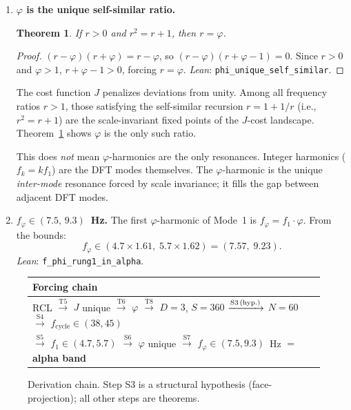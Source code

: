 \documentclass[11pt,a4paper]{article}
\newtheorem{theorem}{Theorem}
\begin{document}
\begin{enumerate}[resume,label=\textbf{S\arabic*.}]
  \item \textbf{$\varphi$ is the unique self-similar ratio.}

    \begin{theorem}
    \label{thm:phi-unique}
    If $r>0$ and $r^2=r+1$, then $r=\varphi$.
    \end{theorem}
    \begin{proof}
    $(r-\varphi)(r+\varphi)=r-\varphi$, so $(r-\varphi)(r+\varphi-1)=0$.
    Since $r>0$ and $\varphi>1$, $r+\varphi-1 > 0$, forcing $r=\varphi$.
    \emph{Lean}: \texttt{phi\_unique\_self\_similar}.
    \end{proof}

    The cost function $J$ penalizes deviations from unity. Among
    all frequency ratios $r>1$, those satisfying the self-similar
    recursion $r = 1 + 1/r$ (i.e., $r^2=r+1$) are the scale-invariant
    fixed points of the $J$-cost landscape. Theorem~\ref{thm:phi-unique}
    shows $\varphi$ is the only such ratio.

    This does \emph{not} mean $\varphi$-harmonics are the only
    resonances. Integer harmonics ($f_k = k f_1$) are the DFT modes
    themselves. The $\varphi$-harmonic is the unique \emph{inter-mode}
    resonance forced by scale invariance; it fills the gap between
    adjacent DFT modes.

  \item \textbf{$f_\varphi \in (7.5,\,9.3)$~Hz.}
    The first $\varphi$-harmonic of Mode~1 is $f_\varphi = f_1 \cdot
    \varphi$. From the bounds:
    \begin{equation}
      \label{eq:phi-rung}
      f_\varphi \in (4.7 \times 1.61,\; 5.7 \times 1.62) = (7.57,\; 9.23).
    \end{equation}
    \emph{Lean}: \texttt{f\_phi\_rung1\_in\_alpha}.
\end{enumerate}

\begin{figure}[H]
\centering
\begin{tabular}{@{}p{}@{}}
\toprule
\textbf{Forcing chain} \\
\midrule
RCL $\xrightarrow{\text{T5}}$ $J$ unique
$\xrightarrow{\text{T6}}$ $\varphi$
$\xrightarrow{\text{T8}}$ $D{=}3$, $S{=}360$
$\xrightarrow{\text{S3\,(hyp.)}}$ $N{=}60$
$\xrightarrow{\text{S4}}$ $f_{\mathrm{cycle}}{\in}(38,45)$ \\[4pt]
$\xrightarrow{\text{S5}}$ $f_1 {\in} (4.7,5.7)$
$\xrightarrow{\text{S6}}$ $\varphi$ unique
$\xrightarrow{\text{S7}}$ $f_\varphi {\in} (7.5,9.3)$~Hz
$=$ \textbf{alpha band} \\
\bottomrule
\end{tabular}
\caption{Derivation chain. Step S3 is a structural hypothesis
(face-projection); all other steps are theorems.}
\label{fig:chain}
\end{figure}
\end{document}
